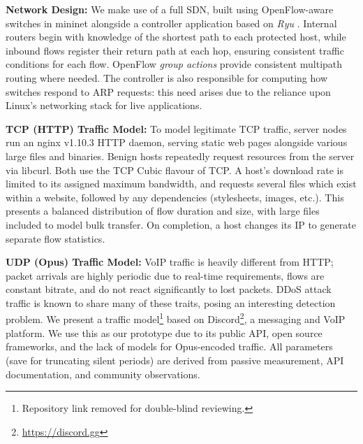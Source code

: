\documentclass[10pt, times, conference, letterpaper]{IEEEtran}
\newcommand{\fakepara}[1]{\noindent\textbf{#1:}}
\begin{document}
\fakepara{Network Design}
We make use of a full SDN, built using OpenFlow-aware switches in mininet alongside a controller application based on \emph{Ryu} \cite{ryu}.
Internal routers begin with knowledge of the shortest path to each protected host, while inbound flows register their return path at each hop, ensuring consistent traffic conditions for each flow.
OpenFlow \emph{group actions} provide consistent multipath routing where needed. 
The controller is also responsible for computing how switches respond to ARP requests: this need arises due to the reliance upon Linux's networking stack for live applications.

\fakepara{TCP (HTTP) Traffic Model}
To model legitimate TCP traffic, server nodes run an nginx v1.10.3 HTTP daemon, serving static web pages alongside various large files and binaries.
Benign hosts repeatedly request resources from the server via libcurl.
Both use the TCP Cubic \cite{rfc8312} flavour of TCP.
A host's download rate is limited to its assigned maximum bandwidth, and requests several files which exist within a website, followed by any dependencies (stylesheets, images, etc.).
This presents a balanced distribution of flow duration and size, with large files included to model bulk transfer.
On completion, a host changes its IP to generate separate flow statistics.

\fakepara{UDP (Opus) Traffic Model}
VoIP traffic is heavily different from HTTP; packet arrivals are highly periodic due to real-time requirements, flows are constant bitrate, and do not react significantly to lost packets.
DDoS attack traffic is known to share many of these traits, posing an interesting detection problem.
We present a traffic model\footnote{Repository link removed for double-blind reviewing.} based on Discord\footnote{\url{https://discord.gg}}, a messaging and VoIP platform.
We use this as our prototype due to its public API, open source frameworks, and the lack of models for Opus-encoded traffic.
All parameters (save for truncating silent periods) are derived from passive measurement, API documentation, and community observations.
\end{document}
